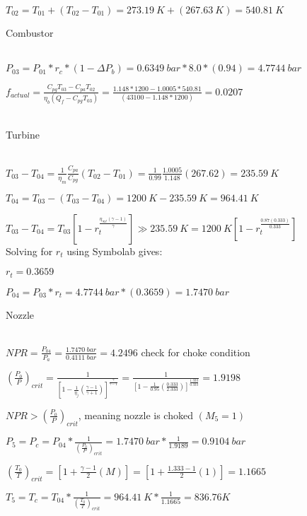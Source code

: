 \documentclass{article}
\begin{document}
$T_{02}=T_{01}+(T_{02}-T_{01})=273.19\ K+(267.63\ K)=540.81\ K$
\\

	\begin{Large}
		Combustor
	\end{Large}
\\

$P_{03}=P_{01}*r_c*(1-\Delta P_b)=0.6349\ bar*8.0*(0.94)=4.7744\ bar$

$f_{actual}=\frac{C_{pg}T_{03}-C_{pa}T_{02}}{\eta_b (Q_f-C_{pg}T_{03})}=\frac{1.148*1200-1.0005*540.81}{ (43100-1.148*1200)}=0.0207$
\\
\\

	\begin{Large}
		Turbine
	\end{Large}
\\

$T_{03}-T_{04}=\frac{1}{\eta_m}\frac{C_{pa}}{C_{pg}}(T_{02}-T_{01})=\frac{1}{0.99}\frac{1.0005}{1.148}(267.62)=235.59\ K$

$T_{04}=T_{03}-(T_{03}-T_{04})=1200\ K-235.59\ K=964.41\ K$

$T_{03}-T_{04}=T_{03}[1-r_t^{\frac{\eta_{\infty t}(\gamma-1)}{\gamma}}]\gg 235.59\ 
K=1200\ K[1-r_t^{\frac{0.87(0.333)}{0.333}}]$
\\

Solving for $r_t$ using Symbolab gives:

$r_t=0.3659$

$P_{04}=P_{03}*r_t=4.7744\ bar*(0.3659)=1.7470\ bar$
\\

	\begin{Large}
		Nozzle
	\end{Large}
\\

$NPR=\frac{P_{04}}{P_a}=\frac{1.7470\ bar}{0.4111\ bar}=4.2496$
check for choke condition

$(\frac{P_0}{P})_{crit}=\frac{1}{[1-\frac{1}{\eta_j}(\frac{\gamma-1}{\gamma+1})]^{\frac{\gamma}{\gamma-1}}}
=\frac{1}{[1-\frac{1}{0.95}(\frac{0.333}{2.333})]^{\frac{1.333}{0.333}}}=1.9198$

$NPR>(\frac{P_0}{P})_{crit}$, meaning nozzle is choked $(M_5=1)$

$P_5=P_c=P_{04}*\frac{1}{(\frac{P_0}{P})_{crit}}=1.7470\ bar*\frac{1}{1.9189}=0.9104\ bar$

$(\frac{T_0}{T})_{crit}=[1+\frac{\gamma-1}{2}(M)]=[1+\frac{1.333-1}{2}(1)]=1.1665$

$T_5=T_c=T_{04}*\frac{1}{(\frac{T_0}{T})_{crit}}=964.41\ K*\frac{1}{1.1665}=836.76K$
\end{document}
